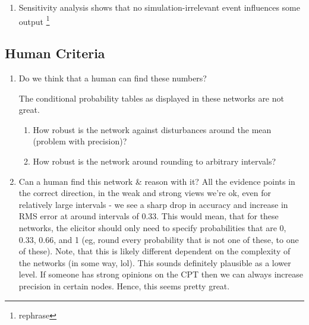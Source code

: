 \begin{enumerate}
The probabilities of the conclusions in the combined network given the premises, also look relatively similar on a human scale - I assume that a human probability elicitor would not be able to distinguish between a probability of 11.13, 10.92 or 10.00 for the conclusion ``Mark falls on knife". On the other hand, if we round all the probabilities in the network to 10, a human probability elicitor might be able to say that the probability of `Mark falls on knife'' is 0.1 (or 10\%), to exactly that level of precision (so not 0.10, or 0.100). The resulting probabilities might be elicitable, while still meaningfully reflecting the ground truth.


\item Sensitivity analysis shows that no simulation-irrelevant event influences some output \footnote{rephrase}
\end{enumerate}

\subsection{Human Criteria}
\begin{enumerate}
\item Do we think that a human can find these numbers?

The conditional probability tables as displayed in these networks are not great.

	\begin{enumerate}
	\item How robust is the network against disturbances around the mean (problem with precision)?
	\item How robust is the network around rounding to arbitrary intervals?
	\end{enumerate}
	
\item Can a human find this network \& reason with it? All the evidence points in the correct direction, in the weak and strong views we're ok, even for relatively large intervals - we see a sharp drop in accuracy and increase in RMS error at around intervals of 0.33. This would mean, that for these networks, the elicitor should only need to specify probabilities that are 0, 0.33, 0.66, and 1 (eg, round every probability that is not one of these, to one of these). Note, that this is likely different dependent on the complexity of the networks (in some way, lol). This sounds definitely plausible as a lower level. If someone has strong opinions on the CPT then we can always increase precision in certain nodes. Hence, this seems pretty great.


\end{enumerate}


